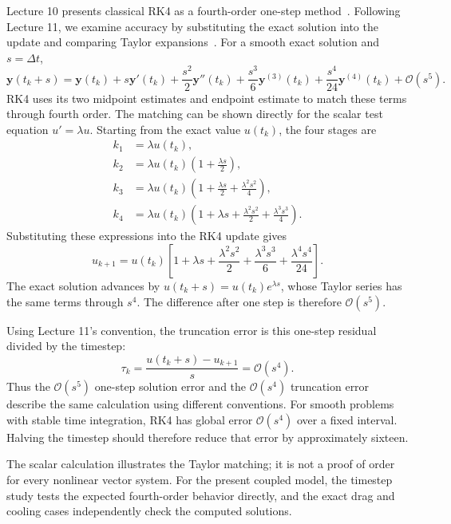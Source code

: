 \documentclass[conf]{new-aiaa}
\begin{document}
Lecture 10 presents classical RK4 as a fourth-order one-step method~\cite{lecture10}.
Following Lecture 11, we examine accuracy by substituting the exact solution
into the update and comparing Taylor expansions~\cite{lecture11}.
For a smooth exact solution and $s=\Delta t$,
\begin{equation}
\mathbf y(t_k+s)=\mathbf y(t_k)
+s\mathbf y'(t_k)+\frac{s^2}{2}\mathbf y''(t_k)
+\frac{s^3}{6}\mathbf y^{(3)}(t_k)
+\frac{s^4}{24}\mathbf y^{(4)}(t_k)+\mathcal O(s^5).
\end{equation}
RK4 uses its two midpoint estimates and endpoint estimate to match these
terms through fourth order. The matching can be shown directly for the
scalar test equation $u'=\lambda u$. Starting from the exact value $u(t_k)$,
the four stages are
\begin{align}
k_1 &= \lambda u(t_k),\\
k_2 &= \lambda u(t_k)\left(1+\frac{\lambda s}{2}\right),\\
k_3 &= \lambda u(t_k)\left(1+\frac{\lambda s}{2}
                             +\frac{\lambda^2s^2}{4}\right),\\
k_4 &= \lambda u(t_k)\left(1+\lambda s+
                   \frac{\lambda^2s^2}{2}+\frac{\lambda^3s^3}{4}\right).
\end{align}
Substituting these expressions into the RK4 update gives
\begin{equation}
u_{k+1}=u(t_k)\left[1+\lambda s+\frac{\lambda^2s^2}{2}
 +\frac{\lambda^3s^3}{6}+\frac{\lambda^4s^4}{24}\right].
\end{equation}
The exact solution advances by $u(t_k+s)=u(t_k)e^{\lambda s}$, whose
Taylor series has the same terms through $s^4$. The difference after
one step is therefore $\mathcal O(s^5)$.

Using Lecture 11's convention, the truncation error is this one-step
residual divided by the timestep:
\begin{equation}
\tau_k=\frac{u(t_k+s)-u_{k+1}}{s}=\mathcal O(s^4).
\end{equation}
Thus the $\mathcal O(s^5)$ one-step solution error and the
$\mathcal O(s^4)$ truncation error describe the same calculation using
different conventions. For smooth problems with stable time integration,
RK4 has global error $\mathcal O(s^4)$ over a fixed interval. Halving
the timestep should therefore reduce that error by approximately sixteen.

The scalar calculation illustrates the Taylor matching; it is not a
proof of order for every nonlinear vector system. For the present coupled
model, the timestep study tests the expected fourth-order behavior directly,
and the exact drag and cooling cases independently check the computed solutions.
\end{document}
